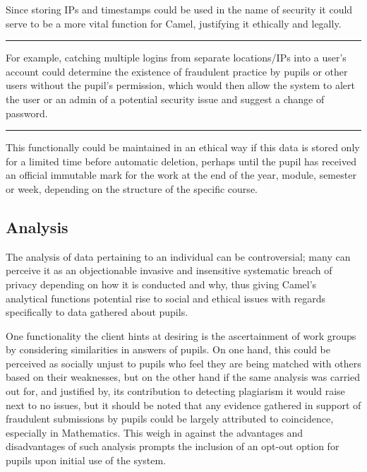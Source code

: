     Since storing IPs and timestamps could be used in the name of security it could serve to be a more vital function for Camel, justifying it ethically and legally.

	\vspace{0.35cm}
    \hrule
    {\raggedleft \scriptsize For example, catching multiple logins from separate locations/IPs into a user’s account could determine the existence of fraudulent practice by pupils or other users without the pupil’s permission, which would then allow the system to alert the user or an admin of a potential security issue and suggest a change of password.\par}
    \vspace{0.35cm}
    \hrule
    
    This functionally could be maintained in an ethical way if this data is stored only for a limited time before automatic deletion, perhaps until the pupil has received an official immutable mark for the work at the end of the year, module, semester or week, depending on the structure of the specific course.

    \subsection*{Analysis}
    The analysis of data pertaining to an individual can be controversial; many can perceive it as an objectionable invasive and insensitive systematic breach of privacy depending on how it is conducted and why, thus giving Camel’s analytical functions potential rise to social and ethical issues with regards specifically to data gathered about pupils.

    One functionality the client hints at desiring is the ascertainment of work groups by considering similarities in answers of pupils. On one hand, this could be perceived as socially unjust to pupils who feel they are being matched with others based on their weaknesses, but on the other hand if the same analysis was carried out for, and justified by, its contribution to detecting plagiarism it would raise next to no issues, but it should be noted that any evidence gathered in support of fraudulent submissions by pupils could be largely attributed to coincidence, especially in Mathematics. This weigh in against the advantages and disadvantages of such analysis prompts the inclusion of an opt-out option for pupils upon initial use of the system.


